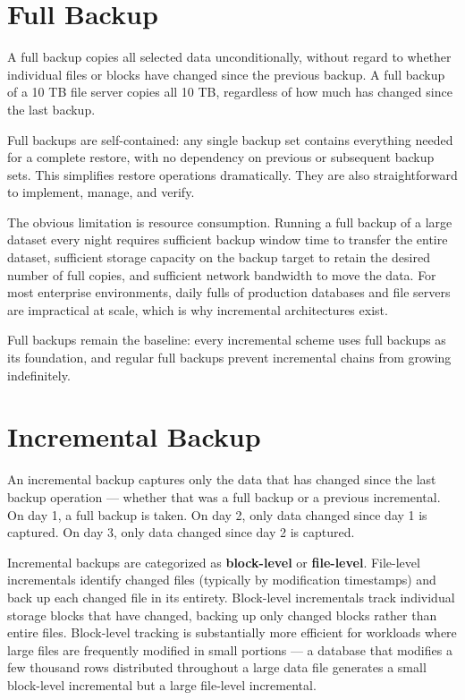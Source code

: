 \section{Full Backup}
A full backup copies all selected data unconditionally, without regard to whether individual files or blocks have changed since the previous backup. A full backup of a 10 TB file server copies all 10 TB, regardless of how much has changed since the last backup.

Full backups are self-contained: any single backup set contains everything needed for a complete restore, with no dependency on previous or subsequent backup sets. This simplifies restore operations dramatically. They are also straightforward to implement, manage, and verify.

The obvious limitation is resource consumption. Running a full backup of a large dataset every night requires sufficient backup window time to transfer the entire dataset, sufficient storage capacity on the backup target to retain the desired number of full copies, and sufficient network bandwidth to move the data. For most enterprise environments, daily fulls of production databases and file servers are impractical at scale, which is why incremental architectures exist.

Full backups remain the baseline: every incremental scheme uses full backups as its foundation, and regular full backups prevent incremental chains from growing indefinitely.

\section{Incremental Backup}
An incremental backup captures only the data that has changed since the last backup operation --- whether that was a full backup or a previous incremental. On day 1, a full backup is taken. On day 2, only data changed since day 1 is captured. On day 3, only data changed since day 2 is captured.

Incremental backups are categorized as \textbf{block-level} or \textbf{file-level}. File-level incrementals identify changed files (typically by modification timestamps) and back up each changed file in its entirety. Block-level incrementals track individual storage blocks that have changed, backing up only changed blocks rather than entire files. Block-level tracking is substantially more efficient for workloads where large files are frequently modified in small portions --- a database that modifies a few thousand rows distributed throughout a large data file generates a small block-level incremental but a large file-level incremental.

